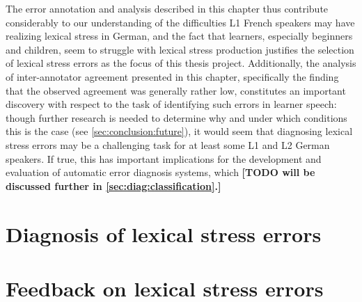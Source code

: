 \documentclass[11pt,a4paper,onecolumn]{article}
\newcommand{\TODO}[1]{{\color{red}\textbf{[TODO #1]}}}
\begin{document}
	The error annotation and analysis described in this chapter thus contribute considerably to our understanding of the difficulties L1 French speakers may have realizing lexical stress in 
	German, 
	and the fact that learners, especially beginners and children, seem to struggle with lexical stress production justifies the selection of lexical stress errors as the focus of this thesis project. Additionally, the analysis of inter-annotator agreement presented in this chapter, specifically the finding that the observed agreement was generally rather low,
	constitutes an important discovery with respect to the task of identifying such errors in learner speech:
	though further research is needed to determine why and under which conditions this is the case (see \cref{sec:conclusion:future}), it would seem that diagnosing lexical stress errors may be a challenging task for at least some L1 and L2 German speakers. If true, this has important implications for the development and evaluation of automatic error diagnosis systems, 
	which
	\TODO{will be discussed further in \cref{sec:diag:classification}.}

\section{Diagnosis of lexical stress errors}

\section{Feedback on lexical stress errors}


\printbibliography[title={References}]
\end{document}

